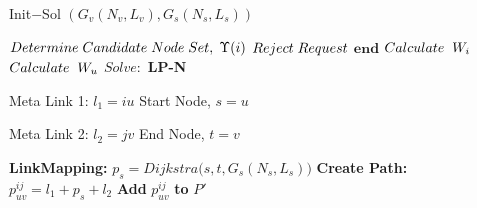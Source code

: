 \documentclass[journal]{IEEEtran}
\begin{document}
\begin{algorithm}[t]
\caption{Init$-$Sol $(G_v(N_v,L_v), G_s(N_s,L_s))$}
\label{Algorithm 1}
\begin{algorithmic}[1]
\STATE $Determine\hspace{1 mm}Candidate\hspace{1 mm}Node\hspace{1 mm}Set,\hspace{1 mm}\Upsilon(i)$
\STATE $Reject\hspace{1 mm}Request$
\STATE $\textbf{end}$
\ENDIF
\STATE $Calculate\hspace{2 mm}W_{i}$
\ENDFOR
{}
\STATE $Calculate\hspace{2 mm}W_{u}$
\ENDFOR
\STATE $Solve:$ \textbf{LP-N}





\STATE Meta Link 1: $l_1 = iu$
\STATE Start Node, $s = u$

\ENDIF

\ENDFOR



\STATE Meta Link 2: $l_2 = jv$
\STATE End Node, $t = v$

\ENDIF

\ENDFOR

\STATE \textbf{LinkMapping:} $p_s = Dijkstra\Big(s, t, G_s(N_s,L_s)\Big)$
\STATE \textbf{Create Path:} $p_{uv}^{ij} = l_1+p_s+l_2$
\STATE \textbf{Add } $p_{uv}^{ij}$ \textbf{ to } $P'$

\ENDFOR
\end{algorithmic}
\end{algorithm}
\end{document}
